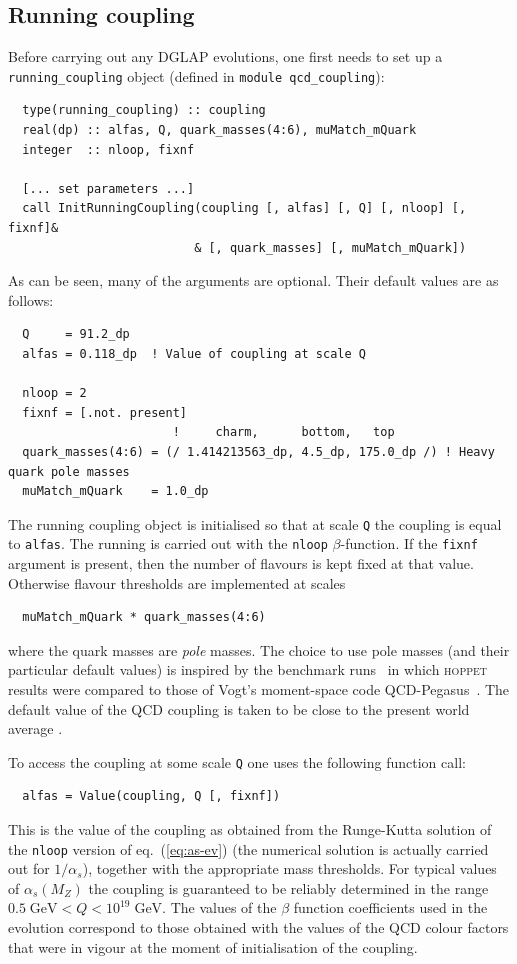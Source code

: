 \documentclass[12pt]{article}
\newcommand{\GeV}{\;\mathrm{GeV}}
\newcommand{\as}{\alpha_s}
\newcommand{\hoppet}{\textsc{hoppet}\xspace}
\newcommand{\ttt}[1]{\texttt{#1}}
\begin{document}
\subsection{Running coupling}
\label{sec:run-coupl}

Before carrying out any DGLAP evolutions, one first needs to set up 
a \ttt{running\_coupling} object (defined in \ttt{module
  qcd\_coupling}):
\begin{lstlisting}
  type(running_coupling) :: coupling
  real(dp) :: alfas, Q, quark_masses(4:6), muMatch_mQuark
  integer  :: nloop, fixnf

  [... set parameters ...]
  call InitRunningCoupling(coupling [, alfas] [, Q] [, nloop] [, fixnf]&
                          & [, quark_masses] [, muMatch_mQuark])
\end{lstlisting}
As can be seen, many of the arguments are optional. Their default
values are as follows:
\begin{lstlisting}
  Q     = 91.2_dp
  alfas = 0.118_dp  ! Value of coupling at scale Q
 
  nloop = 2
  fixnf = [.not. present]
                       !     charm,      bottom,   top
  quark_masses(4:6) = (/ 1.414213563_dp, 4.5_dp, 175.0_dp /) ! Heavy quark pole masses
  muMatch_mQuark    = 1.0_dp
\end{lstlisting}
The running coupling object is initialised so that at scale \ttt{Q}
the coupling is equal to \ttt{alfas}. The running is carried out with
the \ttt{nloop} $\beta$-function. If the \ttt{fixnf} argument is
present, then the number of flavours is kept fixed at that
value. Otherwise flavour thresholds are implemented at scales
\begin{lstlisting}
  muMatch_mQuark * quark_masses(4:6)
\end{lstlisting}
where the quark masses are \emph{pole} masses. The choice to use pole
masses (and their particular default values) is inspired by the
benchmark runs~\cite{Benchmarks} in which \hoppet results were
compared to those of Vogt's moment-space code
QCD-Pegasus~\cite{Pegasus}. The default value of the
QCD coupling is taken to be close
to the present world average \cite{Bethke:2006ac}.

To access the coupling at some scale \ttt{Q} one uses the following
function call:
\begin{lstlisting}
  alfas = Value(coupling, Q [, fixnf])
\end{lstlisting}
This is the value of the coupling as obtained from the Runge-Kutta
solution of the \ttt{nloop} version of eq.~(\ref{eq:as-ev}) (the
numerical solution is actually carried out for $1/\as$), together with the
appropriate mass thresholds. For
typical values of $\as(M_Z)$ the coupling is guaranteed to be reliably
determined in the range $0.5 \GeV < Q < 10^{19}\GeV$. The values of
the $\beta$ function coefficients used in the evolution correspond to
those obtained with the values of the QCD colour factors that were in
vigour at the moment of initialisation of the coupling.
\end{document}
